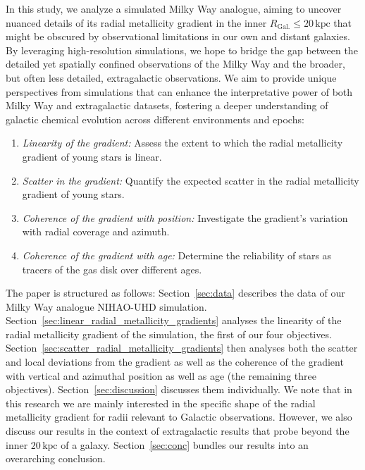 \documentclass[twocolumn,apj,numberedappendix,appendixfloats]{openjournal}
\begin{document}
\begin{CJK*}{UTF8}{gbsn}
In this study, we analyze a simulated Milky Way analogue, aiming to uncover nuanced details of its radial metallicity gradient in the inner $R_\mathrm{Gal.} \leq 20\,\mathrm{kpc}$ that might be obscured by observational limitations in our own and distant galaxies. By leveraging high-resolution simulations, we hope to bridge the gap between the detailed yet spatially confined observations of the Milky Way and the broader, but often less detailed, extragalactic observations. We aim to provide unique perspectives from simulations that can enhance the interpretative power of both Milky Way and extragalactic datasets, fostering a deeper understanding of galactic chemical evolution across different environments and epochs:
\begin{enumerate}
\item \textit{Linearity of the gradient:} Assess the extent to which the radial metallicity gradient of young stars is linear.
\item \textit{Scatter in the gradient:} Quantify the expected scatter in the radial metallicity gradient of young stars.
\item \textit{Coherence of the gradient with position:} Investigate the gradient's variation with radial coverage and azimuth.
\item \textit{Coherence of the gradient with age:} Determine the reliability of stars as tracers of the gas disk over different ages.
\end{enumerate}

The paper is structured as follows: Section~\ref{sec:data} describes the data of our Milky Way analogue NIHAO-UHD simulation. Section~\ref{sec:linear_radial_metallicity_gradients} analyses the linearity of the radial metallicity gradient of the simulation, the first of our four objectives. Section~\ref{sec:scatter_radial_metallicity_gradients} then analyses both the scatter and local deviations from the gradient as well as the coherence of the gradient with vertical and azimuthal position as well as age (the remaining three objectives). Section~\ref{sec:discussion} discusses them individually. We note that in this research we are mainly interested in the specific shape of the radial metallicity gradient for radii relevant to Galactic observations. However, we also discuss our results in the context of extragalactic results that probe beyond the inner $20\,\mathrm{kpc}$ of a galaxy. Section~\ref{sec:conc} bundles our results into an overarching conclusion. 


\end{CJK*}
\end{document}
